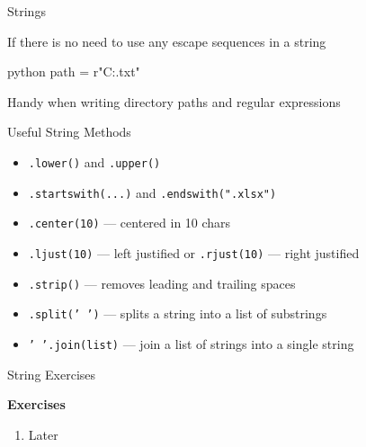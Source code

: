 \documentclass[
	11pt, 
]{beamer}
\begin{document}
\begin{frame}[fragile]{Strings}

If there is no need to use any escape sequences in a string

\begin{mintedbox}{python}
path = r"C:\documents\course\news.txt"
\end{mintedbox}

Handy when writing directory paths and regular expressions

\begin{exampleblock}{Useful String Methods}
    \begin{itemize}
        \item \texttt{.lower()} and \texttt{.upper()}
        \item \texttt{.startswith(...)} and \texttt{.endswith(".xlsx")}
        \item \texttt{.center(10)} --- centered in 10 chars
        \item \texttt{.ljust(10)} --- left justified or \texttt{.rjust(10)} --- right justified
        \item \texttt{.strip()} --- removes leading and trailing spaces
        \item \texttt{.split(' ')} --- splits a string into a list of substrings
        \item \texttt{' '.join(list)} --- join a list of strings into a single string 
    \end{itemize}
\end{exampleblock}

\end{frame}


\begin{frame}[fragile]{String Exercises}

\begin{alertblock}{\textbf{Exercises}}
\begin{enumerate}
    \item Later
\end{enumerate}    
\end{alertblock}

\end{frame}


\end{document}
